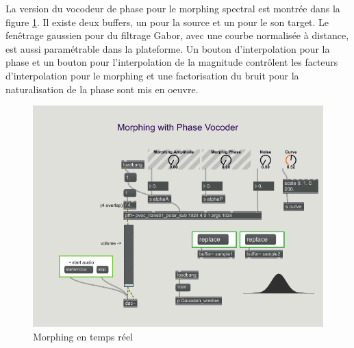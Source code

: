 \noindent\begin{minipage}{\textwidth}

\end{minipage}

La version du vocodeur de phase pour le morphing spectral est montrée dans la figure \ref{Morphing}. Il existe deux buffers, un pour la source et un pour le son target. Le fenêtrage gaussien pour du filtrage Gabor, avec une courbe normalisée à distance, est aussi paramétrable dans la plateforme. Un bouton d’interpolation pour la phase et un bouton pour l’interpolation de la magnitude contrôlent les facteurs d’interpolation pour le morphing et une factorisation du bruit pour la naturalisation de la phase sont mis en oeuvre.

    \begin{figure}
        \centering
        \includegraphics[width = \textwidth]{Graphs/SoundMorphing.png}
        \caption{Morphing en temps réel}
        \label{Morphing}
    \end{figure}